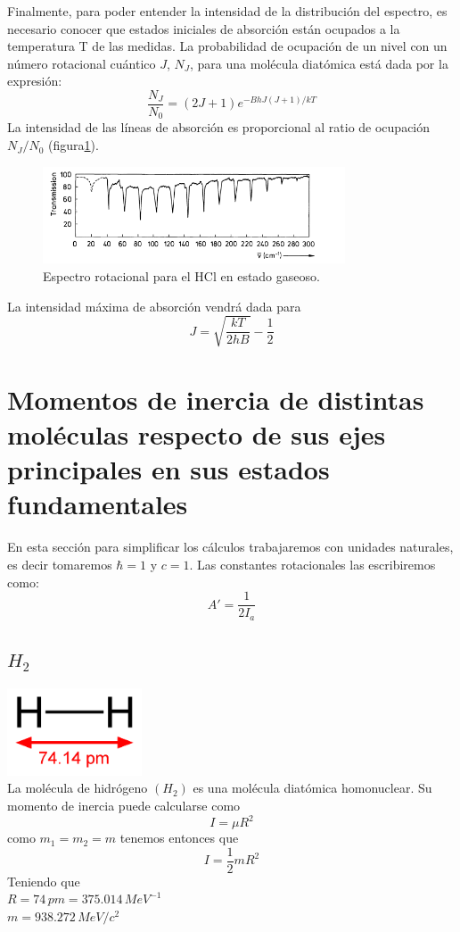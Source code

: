 \documentclass[a4paper]{article}
\begin{document}
Finalmente, para poder entender la intensidad de la distribución del espectro, es necesario conocer que estados iniciales de absorción están ocupados a la temperatura T de las medidas. La probabilidad de ocupación de un nivel con un número rotacional cuántico $J$, $N_J$, para una molécula diatómica está dada por la expresión:
\begin{equation}
\frac{N_J}{N_0}=(2J+1)e^{-BhJ(J+1)/kT}
\end{equation}
La intensidad de las líneas de absorción es proporcional al ratio de ocupación $N_J/N_0$ (figura\ref{intensidad}). 
\begin{figure}
\includegraphics[width=0.8\textwidth]{intensidad.png}
\caption{Espectro rotacional para el HCl en estado gaseoso.}
\label{intensidad}
\end{figure}
La intensidad máxima de absorción vendrá dada para
\begin{equation}
J=\sqrt{\frac{kT}{2hB}}-\frac{1}{2}
\end{equation}

\section{Momentos de inercia de distintas moléculas respecto de sus ejes principales en sus estados fundamentales}
En esta sección  para simplificar los cálculos trabajaremos con unidades naturales, es decir tomaremos $\hbar = 1$ y $c=1$.
Las constantes rotacionales las escribiremos como:
$$A' = \frac{1}{2I_a}$$
\subsection{$H_2$}
\includegraphics[width=0.3\textwidth]{hidrogeno.png}\\
La molécula de hidrógeno $(H_2)$ es una molécula diatómica homonuclear. Su momento de inercia puede calcularse como $$I=\mu R^2$$
como $m_1=m_2=m$ tenemos entonces que $$I=\frac{1}{2}mR^2$$
Teniendo que\\
 $R=74 \, pm=375.014 \, MeV^{-1}$\\
 $m=938.272 \, MeV/c^2$\\
 
\end{document}
